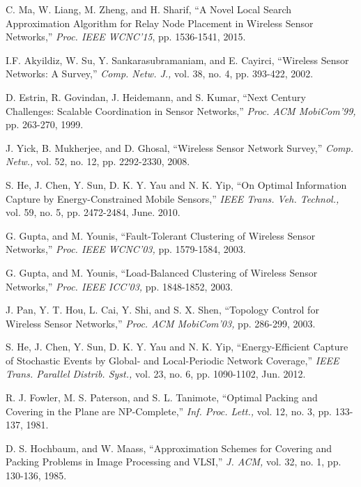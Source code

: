 \documentclass[journal]{IEEEtran}
\begin{document}
\begin{thebibliography}{1}
C. Ma, W. Liang, M. Zheng, and H. Sharif, ``A Novel Local Search Approximation Algorithm for
Relay Node Placement in Wireless Sensor Networks,'' \emph{Proc. IEEE WCNC'15}, pp. 1536-1541, 2015.

I.F. Akyildiz, W. Su, Y. Sankarasubramaniam, and E. Cayirci, ``Wireless Sensor Networks:
A Survey,'' {\it Comp. Netw. J.,} vol. 38, no. 4, pp. 393-422, 2002.

D. Estrin, R. Govindan, J. Heidemann, and S. Kumar, ``Next Century Challenges: Scalable Coordination
in Sensor Networks,'' {\it Proc. ACM MobiCom'99,} pp. 263-270, 1999.

J. Yick, B. Mukherjee, and D. Ghosal, ``Wireless Sensor Network Survey,'' {\it Comp. Netw.,}
vol. 52, no. 12, pp. 2292-2330, 2008.


 S. He, J. Chen, Y. Sun, D. K. Y. Yau and N. K. Yip, ``On Optimal Information Capture by Energy-Constrained Mobile Sensors,'' {\it IEEE Trans. Veh. Technol.,} vol. 59, no. 5, pp. 2472-2484, June. 2010.





G. Gupta, and M. Younis, ``Fault-Tolerant Clustering of Wireless Sensor Networks,'' {\it Proc. IEEE
WCNC'03,} pp. 1579-1584, 2003.

G. Gupta, and M. Younis, ``Load-Balanced Clustering of Wireless Sensor Networks,'' {\it Proc. IEEE
ICC'03,} pp. 1848-1852, 2003.

J. Pan, Y. T. Hou, L. Cai, Y. Shi, and S. X. Shen, ``Topology Control for Wireless Sensor Networks,''
{\it Proc. ACM MobiCom'03,} pp. 286-299, 2003.

 S. He, J. Chen, Y. Sun, D. K. Y. Yau and N. K. Yip, ``Energy-Efficient Capture of Stochastic Events by Global- and Local-Periodic Network Coverage,'' {\it IEEE Trans. Parallel Distrib. Syst.,} vol. 23, no. 6, pp. 1090-1102, Jun. 2012.

R. J. Fowler, M. S. Paterson, and S. L. Tanimote, ``Optimal Packing and Covering in the Plane are NP-Complete,''
{\it Inf. Proc. Lett.,} vol. 12, no. 3, pp. 133-137, 1981.

D. S. Hochbaum, and W. Maass, ``Approximation Schemes for Covering and Packing Problems in Image Processing and VLSI,''
{\it J. ACM,} vol. 32, no. 1, pp. 130-136, 1985.


\end{thebibliography}
\end{document}
